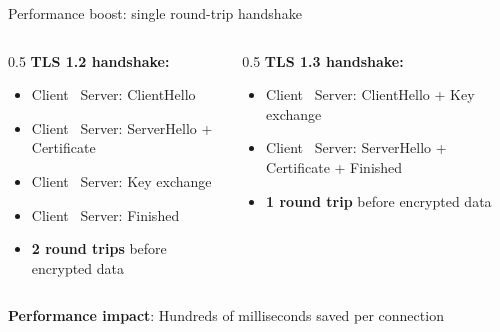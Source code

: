 \ifdefined\PRESENTATION\else\PassOptionsToClass{handout}{beamer}\fi\documentclass[aspectratio=169, lualatex]{beamer}
\begin{document}
\begin{frame}{Performance boost: single round-trip handshake}
	\begin{columns}[c]
		\begin{column}{0.5\textwidth}
			\textbf{TLS 1.2 handshake:}
			\begin{itemize}
				\item Client \rightarrow\ Server: ClientHello
				\item Client \leftarrow\ Server: ServerHello + Certificate
				\item Client \rightarrow\ Server: Key exchange
				\item Client \leftarrow\ Server: Finished
				\item \textbf{2 round trips} before encrypted data
			\end{itemize}
		\end{column}
		\begin{column}{0.5\textwidth}
			\textbf{TLS 1.3 handshake:}
			\begin{itemize}
				\item Client \rightarrow\ Server: ClientHello + Key exchange
				\item Client \leftarrow\ Server: ServerHello + Certificate + Finished
				\item \textbf{1 round trip} before encrypted data
			\end{itemize}
		\end{column}
	\end{columns}
	\pause
	\begin{center}
		\textbf{Performance impact}: Hundreds of milliseconds saved per connection
	\end{center}
\end{frame}
\end{document}
